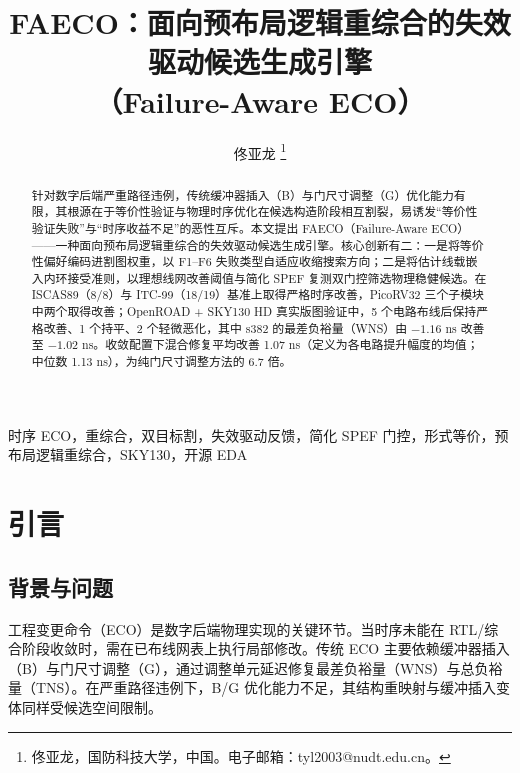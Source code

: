 \documentclass[journal]{IEEEtran}
\title{FAECO：面向预布局逻辑重综合的失效驱动候选生成引擎\\
（Failure-Aware ECO）}
\author{佟亚龙%
\thanks{佟亚龙，国防科技大学，中国。电子邮箱：tyl2003@nudt.edu.cn。}}
\begin{document}
\maketitle

\sloppy

\begin{abstract}
针对数字后端严重路径违例，传统缓冲器插入（B）与门尺寸调整（G）优化能力有限，其根源在于等价性验证与物理时序优化在候选构造阶段相互割裂，易诱发“等价性验证失败”与“时序收益不足”的恶性互斥。本文提出 FAECO（Failure-Aware ECO）——一种面向预布局逻辑重综合的失效驱动候选生成引擎。核心创新有二：一是将等价性偏好编码进割图权重，以 F1--F6 失败类型自适应收缩搜索方向；二是将估计线载嵌入内环接受准则，以理想线网改善阈值与简化 SPEF 复测双门控筛选物理稳健候选。在 ISCAS89（8/8）与 ITC-99（18/19）基准上取得严格时序改善，PicoRV32 三个子模块中两个取得改善；OpenROAD + SKY130 HD 真实版图验证中，5 个电路布线后保持严格改善、1 个持平、2 个轻微恶化，其中 s382 的最差负裕量（WNS）由 $-1.16$ ns 改善至 $-1.02$ ns。收敛配置下混合修复平均改善 1.07 ns（定义为各电路提升幅度的均值；中位数 1.13 ns），为纯门尺寸调整方法的 6.7 倍。
\end{abstract}

\begin{IEEEkeywords}
时序 ECO，重综合，双目标割，失效驱动反馈，简化 SPEF 门控，形式等价，预布局逻辑重综合，SKY130，开源 EDA
\end{IEEEkeywords}

\section{引言}

\subsection{背景与问题}

工程变更命令（ECO）是数字后端物理实现的关键环节。当时序未能在 RTL/综合阶段收敛时，需在已布线网表上执行局部修改。传统 ECO 主要依赖缓冲器插入（B）与门尺寸调整（G），通过调整单元延迟修复最差负裕量（WNS）与总负裕量（TNS）。在严重路径违例下，B/G 优化能力不足，其结构重映射与缓冲插入变体同样受候选空间限制\cite{chen2012metal,chen2012fixability,liang2012buffer,ho2010eco}。
\end{document}
